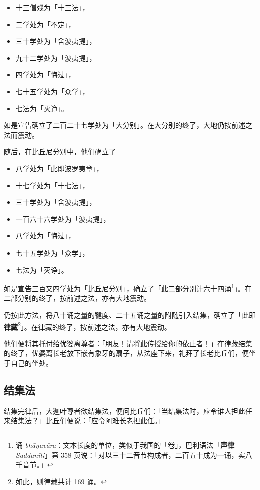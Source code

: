 \begin{itemize}[nosep]
    \item 十三僧残为「十三法」，
    \item 二学处为「不定」，
    \item 三十学处为「舍波夷提」，
    \item 九十二学处为「波夷提」，
    \item 四学处为「悔过」，
    \item 七十五学处为「众学」，
    \item 七法为「灭诤」。
\end{itemize}

如是宣告确立了二百二十七学处为「大分别」。在大分别的终了，大地仍按前述之法而震动。

随后，在比丘尼分别中，他们确立了

\begin{itemize}[nosep]
    \item 八学处为「此即波罗夷章」，
    \item 十七学处为「十七法」，
    \item 三十学处为「舍波夷提」，
    \item 一百六十六学处为「波夷提」，
    \item 八学处为「悔过」，
    \item 七十五学处为「众学」，
    \item 七法为「灭诤」。
\end{itemize}

如是宣告三百又四学处为「比丘尼分别」，确立了「此二部分别计六十四诵\footnote{诵 \textit{bhāṇavāra}：文本长度的单位，类似于我国的「卷」，巴利语法「\textbf{声律} \textit{Saddanīti}」第 358 页说：「对以三十二音节构成者，二百五十成为一诵，实八千音节。」}」。在二部分别的终了，按前述之法，亦有大地震动。

仍按此方法，将八十诵之量的犍度、二十五诵之量的附随引入结集，确立了「此即\textbf{律藏}\footnote{如此，则律藏共计 169 诵。}」。在律藏的终了，按前述之法，亦有大地震动。

他们便将其托付给优婆离尊者：「朋友！请将此传授给你的依止者！」在律藏结集的终了，优婆离长老放下嵌有象牙的扇子，从法座下来，礼拜了长老比丘们，便坐于自己的坐处。

\subsection*{结集法}

结集完律后，大迦叶尊者欲结集法，便问比丘们：「当结集法时，应令谁人担此任来结集法？」比丘们便说：「应令阿难长老担此任。」

